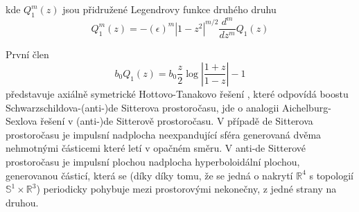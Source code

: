 kde $Q_1^m(z)$ jsou přidružené Legendrovy funkce druhého druhu
\begin{equation}
    Q_1^m(z) = -(\epsilon)^m |1-z^2|^{m/2} \frac{d^m}{dz^m}Q_1(z)
\end{equation}

První člen
\begin{equation}
    b_0 Q_1(z) = b_0 \frac{z}{2} \log \left|\frac{1+z}{1-z}\right| - 1
\end{equation}
představuje axiálně symetrické Hottovo-Tanakovo řešení \cite{Hotta_1993}, které odpovídá boostu Schwarzschildova-(anti-)de Sitterova
prostoročasu, jde o analogii Aichelburg-Sexlova řešení v (anti-)de Sitterově prostoročasu. V případě de Sitterova prostoročasu je impulsní nadplocha
neexpandující sféra generovaná dvěma nehmotnými částicemi které letí v opačném směru. V anti-de Sitterové prostoročasu je impulsní plochou nadplocha hyperboloidální
plochou, generovanou částicí, která se (díky díky tomu, že se jedná o nakrytí $\mathbb{R}^4$ s topologií $\mathbb{S}^1 \times \mathbb{R}^3$) periodicky pohybuje mezi prostorovými nekonečny,
z jedné strany na druhou.

